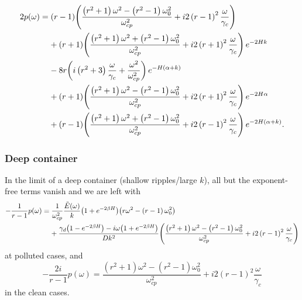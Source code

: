 \documentclass[reqno]{amsart}
\numberwithin{equation}{section}
\numberwithin{figure}{section}
\begin{document}
\begin{align*}
2p\!\left(\omega\right)
  &= \left(r-1\right)\!\left(\frac{\left(r^{2}+1\right)\omega^{2}-\left(r^{2}-1\right)\omega_{0}^{2}}{\omega_{cp}^{2}}+i2\left(r-1\right)^{2}\frac{\omega}{\gamma_{c}}\right) \\
  &\phantom{=}\,\,+\left(r+1\right)\!\left(\frac{\left(r^{2}+1\right)\omega^{2}+\left(r^{2}-1\right)\omega_{0}^{2}}{\omega_{cp}^{2}}+i2\left(r+1\right)^{2}\frac{\omega}{\gamma_{c}}\right)e^{-2H k} \\
  &\phantom{=}\,\,-8r\!\left(i\left(r^{2}+3\right)\frac{\omega}{\gamma_{c}}+\frac{\omega^{2}}{\omega_{cp}^{2}}\right)e^{-H\left(\alpha+k\right)} \\
  &\phantom{=}\,\,+\left(r+1\right)\!\left(\frac{\left(r^{2}+1\right)\omega^{2}-\left(r^{2}-1\right)\omega_{0}^{2}}{\omega_{cp}^{2}}+i2\left(r+1\right)^{2}\frac{\omega}{\gamma_{c}}\right)e^{-2H\alpha} \\
  &\phantom{=}\,\,+\left(r-1\right)\!\left(\frac{\left(r^{2}+1\right)\omega^{2}+\left(r^{2}-1\right)\omega_{0}^{2}}{\omega_{cp}^{2}}+i2\left(r-1\right)^{2}\frac{\omega}{\gamma_{c}}\right)e^{-2H\left(\alpha+k\right)}.
\end{align*}

\subsubsection{Deep container}

In the limit of a deep container (shallow ripples/large $k$), all but the exponent-free terms vanish and we are left with
\begin{align*}
-\frac{1}{r-1}p\!\left(\omega\right)
  &= \frac{1}{\omega_{cp}^{2}}\frac{\tilde{E}\!\left(\omega\right)}{k}\!\left(1+e^{-2\beta H}\right)\!\left(r\omega^{2}-\left(r-1\right)\omega_{0}^{2}\right) \\
  &\phantom{=}\,\,+\frac{\gamma_{d}\!\left(1-e^{-2\beta H}\right)-i\omega\!\left(1+e^{-2\beta H}\right)}{Dk^{2}}\!\left(\frac{\left(r^{2}+1\right)\omega^{2}-\left(r^{2}-1\right)\omega_{0}^{2}}{\omega_{cp}^{2}}+i2\left(r-1\right)^{2}\frac{\omega}{\gamma_{c}}\right)
\end{align*}
at polluted cases, and
\begin{equation*}
-\frac{2i}{r-1}p\!\left(\omega\right) = \frac{\left(r^{2}+1\right)\omega^{2}-\left(r^{2}-1\right)\omega_{0}^{2}}{\omega_{cp}^{2}}+i2\left(r-1\right)^{2}\frac{\omega}{\gamma_{c}}
\end{equation*}
in the clean cases.



\end{document}
